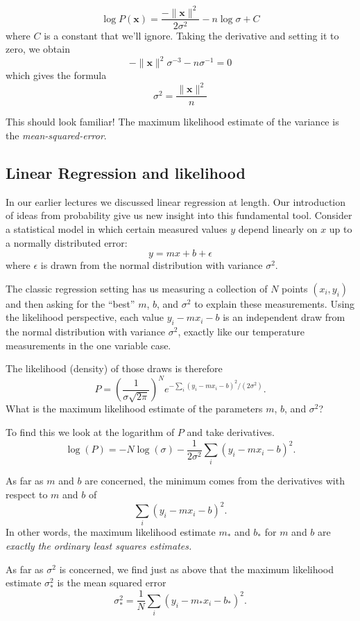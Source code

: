 \documentclass[
  11pt,
  letterpaper,
]{scrbook}
\theoremstyle{plain}
\theoremstyle{remark}
\begin{document}
\[
\log P(\mathbf{x})=\frac{-\|\mathbf{x}\|^2}{2\sigma^2}-n\log{\sigma}+C
\] where \(C\) is a constant that we'll ignore. Taking the derivative
and setting it to zero, we obtain \[
-\|\mathbf{x}\|^2\sigma^{-3}-n\sigma^{-1}=0
\] which gives the formula \[
\sigma^2=\frac{\|\mathbf{x}\|^2}{n}
\]

This should look familiar! The maximum likelihood estimate of the
variance is the \emph{mean-squared-error}.

\hypertarget{sec-LRLike}{%
\subsection{Linear Regression and likelihood}\label{sec-LRLike}}

In our earlier lectures we discussed linear regression at length. Our
introduction of ideas from probability give us new insight into this
fundamental tool. Consider a statistical model in which certain measured
values \(y\) depend linearly on \(x\) up to a normally distributed
error: \[
y=mx+b+\epsilon
\] where \(\epsilon\) is drawn from the normal distribution with
variance \(\sigma^2\).

The classic regression setting has us measuring a collection of \(N\)
points \((x_i,y_i)\) and then asking for the ``best'' \(m\), \(b\), and
\(\sigma^2\) to explain these measurements. Using the likelihood
perspective, each value \(y_i-mx_i-b\) is an independent draw from the
normal distribution with variance \(\sigma^2\), exactly like our
temperature measurements in the one variable case.

The likelihood (density) of those draws is therefore \[
P = \left(\frac{1}{\sigma\sqrt{2\pi}}\right)^Ne^{-\sum_{i}(y_i-mx_i-b)^2/(2\sigma^2)}.
\] What is the maximum likelihood estimate of the parameters \(m\),
\(b\), and \(\sigma^2\)?

To find this we look at the logarithm of \(P\) and take derivatives. \[
\log(P) = -N\log(\sigma) -\frac{1}{2\sigma^2}\sum_{i}(y_i-mx_i-b)^2.
\]

As far as \(m\) and \(b\) are concerned, the minimum comes from the
derivatives with respect to \(m\) and \(b\) of \[
\sum_{i}(y_i-mx_i-b)^2.
\] In other words, the maximum likelihood estimate \(m_*\) and \(b_*\)
for \(m\) and \(b\) are \emph{exactly the ordinary least squares
estimates.}

As far as \(\sigma^2\) is concerned, we find just as above that the
maximum likelihood estimate \(\sigma^2_*\) is the mean squared error \[
\sigma^2_*=\frac{1}{N}\sum_{i}(y_i-m_*x_i-b_*)^2.
\]
\end{document}
